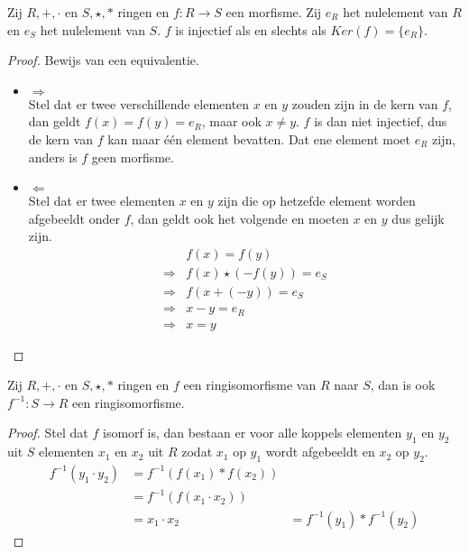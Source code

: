 \documentclass[main.tex]{subfiles}
\begin{document}
\begin{ei}
  Zij $R,+,\cdot$ en $S,\star,*$ ringen en $f:R \rightarrow S$ een morfisme.
  Zij $e_{R}$ het nulelement van $R$ en $e_{S}$ het nulelement van $S$.
  $f$ is injectief als en slechts als $Ker(f) = \{e_{R}\}$.

  \begin{proof}
    Bewijs van een equivalentie.
    \begin{itemize}
    \item $\Rightarrow$\\
      Stel dat er twee verschillende elementen $x$ en $y$ zouden zijn in de kern van $f$, dan geldt $f(x) = f(y) = e_{R}$, maar ook $x \neq y$.
      $f$ is dan niet injectief, dus de kern van $f$ kan maar \'e\'en element bevatten.
      Dat ene element moet $e_{R}$ zijn, anders is $f$ geen morfisme.
    \item $\Leftarrow$\\
      Stel dat er twee elementen $x$ en $y$ zijn die op hetzefde element worden afgebeeldt onder $f$, dan geldt ook het volgende en moeten $x$ en $y$ dus gelijk zijn.
      \[
      \begin{array}{rl}
        & f(x) = f(y)\\ 
        \Rightarrow & f(x) \star (-f(y)) = e_{S}\\
        \Rightarrow & f(x + (-y)) = e_{S} \\
        \Rightarrow & x-y = e_{R} \\
        \Rightarrow & x = y
      \end{array}
      \]
    \end{itemize}
  \end{proof}
\end{ei}

\begin{ei}
  \label{ei:inverse-afbeelding-ook-isomorfisme}
  Zij $R,+,\cdot$ en $S,\star,*$ ringen en $f$ een ringisomorfisme van $R$ naar $S$, dan is ook $f^{-1}: S \rightarrow R$ een ringisomorfisme.

  \begin{proof}
    Stel dat $f$ isomorf is, dan bestaan er voor alle koppels elementen $y_{1}$ en $y_{2}$ uit $S$ elementen $x_{1}$ en $x_{2}$ uit $R$ zodat $x_{1}$ op $y_{1}$ wordt afgebeeldt en $x_{2}$ op $y_{2}$.
    \[
    \begin{array}{rll}
    f^{-1}(y_{1}\cdot y_{2}) &= f^{-1}(f(x_{1})*f(x_{2})) &\\
                           &= f^{-1}(f(x_{1} \cdot x_{2})) &\\
                           &= x_{1} \cdot x_{2} &= f^{-1}(y_{1}) * f^{-1}(y_{2})
    \end{array}
    \]
  \end{proof}
\end{ei}
\end{document}
